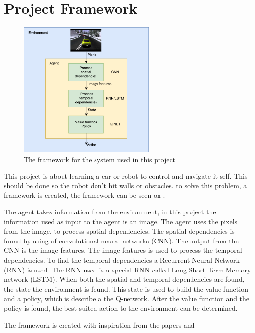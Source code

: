 \chapter{Project Framework}
\label{chap:projectdef}



\begin{figure}
	\centering
	\includegraphics[width=0.6\textwidth]{Figures/ProjectFramework/Project_framework_diagram}
	\caption{The framework for the system used in this project}
	\label{fig:Project_framework}
\end{figure}
This project is about learning a car or robot to control and navigate it self. This should be done so the robot don't hit walls or obstacles. to solve this problem, a framework is created, the framework can be seen on .

The agent takes information from the environment, in this project the information used as input to the agent is an image. The agent uses the pixels from the image, to process spatial dependencies. The spatial dependencies is found by using of convolutional neural networks (CNN). The output from the CNN is the image features. The image features is used to process the temporal dependencies. To find the temporal dependencies a Recurrent Neural Network (RNN) is used. The RNN used is a special RNN called Long Short Term Memory network (LSTM). When both the spatial and temporal dependencies are found, the state the environment is found. This state is used to build the value function and a policy, which is describe a the Q-network. After the value function and the policy is found, the best suited action to the environment can be determined.


The framework is created with inspiration from the papers  \cite{DBLP:journals/corr/MnihBMGLHSK16} and \cite{Sallab:2017:2470-1173:70}
\newline






